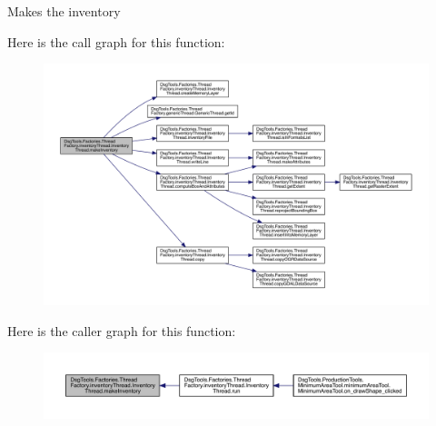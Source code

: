 \begin{DoxyVerb}Makes the inventory
\end{DoxyVerb}
 Here is the call graph for this function\+:
\nopagebreak
\begin{figure}[H]
\begin{center}
\leavevmode
\includegraphics[width=350pt]{class_dsg_tools_1_1_factories_1_1_thread_factory_1_1inventory_thread_1_1_inventory_thread_a3a79e7cbac8812c3ee82fc4cdf405149_cgraph}
\end{center}
\end{figure}
Here is the caller graph for this function\+:
\nopagebreak
\begin{figure}[H]
\begin{center}
\leavevmode
\includegraphics[width=350pt]{class_dsg_tools_1_1_factories_1_1_thread_factory_1_1inventory_thread_1_1_inventory_thread_a3a79e7cbac8812c3ee82fc4cdf405149_icgraph}
\end{center}
\end{figure}
\mbox{\label{class_dsg_tools_1_1_factories_1_1_thread_factory_1_1inventory_thread_1_1_inventory_thread_a854b1e38ffd3073ea2343a4f8869cac9}} 
